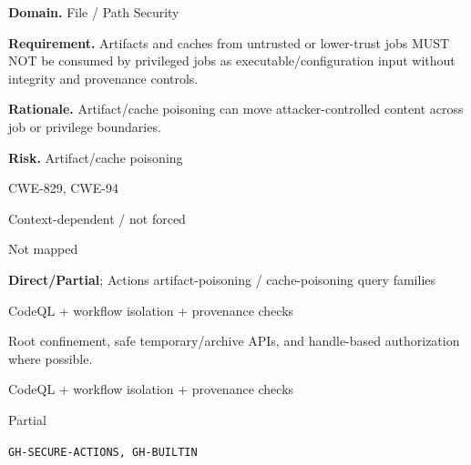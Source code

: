 \documentclass[10pt,letterpaper]{article}
\newcommand{\prioritybadge}[2]{\tcbox[on line,boxrule=0pt,arc=1.2mm,boxsep=0.7mm,left=1mm,right=1mm,top=0.4mm,bottom=0.4mm,colback=#2!12,coltext=#2]{\scriptsize\bfseries #1}}
\begin{document}
\begin{rulebox}[title={\texttt{SCS-ACTIONS-FILE-001} \hfill \prioritybadge{High Priority}{High}}]
\textbf{Domain.} File / Path Security

\textbf{Requirement.} Artifacts and caches from untrusted or lower-trust jobs MUST NOT be consumed by privileged jobs as executable/configuration input without integrity and provenance controls.

\textbf{Rationale.} Artifact/cache poisoning can move attacker-controlled content across job or privilege boundaries.

\textbf{Risk.} Artifact/cache poisoning

\begin{description}[leftmargin=2.65cm,labelwidth=2.3cm,style=nextline,itemsep=1pt,topsep=3pt]
  \item[CWE] CWE-829, CWE-94
  \item[OWASP] Context-dependent / not forced
  \item[CERT] Not mapped
  \item[CodeQL] \textbf{Direct/Partial}; Actions artifact-poisoning / cache-poisoning query families
  \item[Enforcement] CodeQL + workflow isolation + provenance checks
  \item[Prevention] Root confinement, safe temporary/archive APIs, and handle-based authorization where possible.
  \item[Verification] CodeQL + workflow isolation + provenance checks
  \item[Automation] Partial
  \item[Sources] \texttt{GH-SECURE-ACTIONS, GH-BUILTIN}
\end{description}
\end{rulebox}
\end{document}
